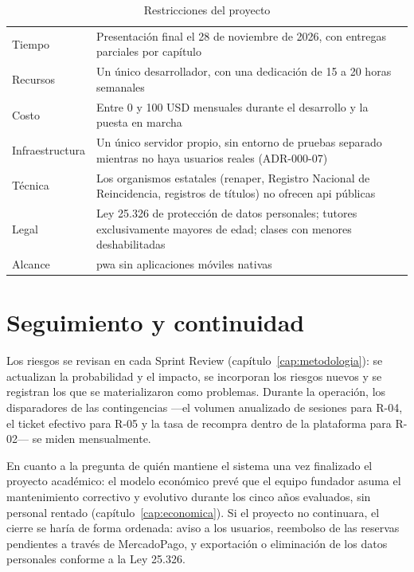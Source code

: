 \begin{table}[H]
    \centering
    \caption{Restricciones del proyecto}
    \label{tab:restricciones}
    \small
    \begin{tabularx}{\textwidth}{l L}
        \toprule
         &  \\
        \midrule
        Tiempo    & Presentación final el 28 de noviembre de 2026, con entregas parciales por capítulo \\
        Recursos  & Un único desarrollador, con una dedicación de 15 a 20 horas semanales \\
        Costo     & Entre 0 y 100 USD mensuales durante el desarrollo y la puesta en marcha \\
        Infraestructura & Un único servidor propio, sin entorno de pruebas separado mientras no haya usuarios reales (ADR-000-07) \\
        Técnica   & Los organismos estatales (\gls{renaper}, Registro Nacional de Reincidencia, registros de títulos) no ofrecen \gls{api} públicas \\
        Legal     & Ley 25.326 de protección de datos personales; tutores exclusivamente mayores de edad; clases con menores deshabilitadas \\
        Alcance   & \gls{pwa} sin aplicaciones móviles nativas \\
        \bottomrule
    \end{tabularx}
\end{table}

\section{Seguimiento y continuidad}

Los riesgos se revisan en cada Sprint Review (capítulo~\ref{cap:metodologia}):
se actualizan la probabilidad y el impacto, se incorporan los riesgos
nuevos y se registran los que se materializaron como problemas. Durante
la operación, los disparadores de las contingencias ---el volumen
anualizado de sesiones para R-04, el ticket efectivo para R-05 y la tasa
de recompra dentro de la plataforma para R-02--- se miden mensualmente.

En cuanto a la pregunta de quién mantiene el sistema una vez finalizado
el proyecto académico: el modelo económico prevé que el equipo fundador
asuma el mantenimiento correctivo y evolutivo durante los cinco años
evaluados, sin personal rentado (capítulo~\ref{cap:economica}). Si el
proyecto no continuara, el cierre se haría de forma ordenada: aviso a
los usuarios, reembolso de las reservas pendientes a través de
MercadoPago, y exportación o eliminación de los datos personales
conforme a la Ley 25.326.
